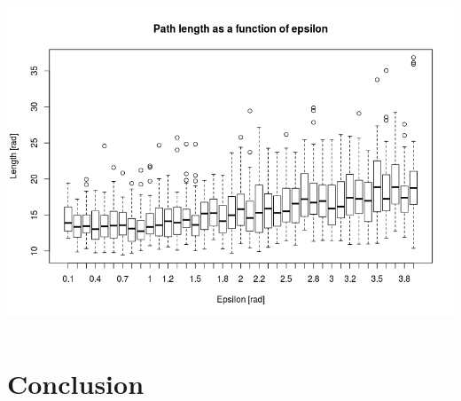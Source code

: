 \documentclass{beamer}
\begin{document}
\begin{frame}
\begin{columns}
\begin{column}{0.5\textwidth}
\begin{center}
      \end{center}
      \begin{center}
        \includegraphics[width=\textwidth]{./length_v_eps_full}
      \end{center}
    \end{column}
  \end{columns}
\end{frame}


\section{Conclusion}
\end{document}
